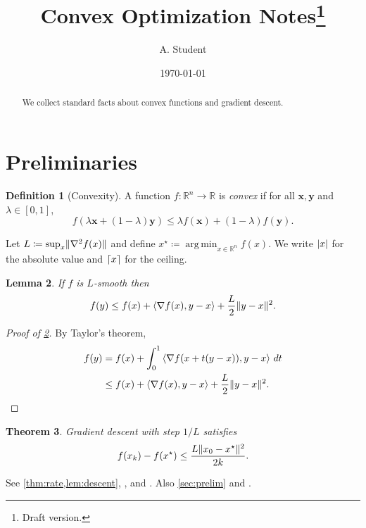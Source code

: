 \documentclass[11pt,a4paper]{article}
\title{Convex Optimization Notes\thanks{Draft version.}}
\author{A. Student}
\date{\today}
\DeclarePairedDelimiter{\abs}{\lvert}{\rvert}
\DeclarePairedDelimiter\norm{\lVert}{\rVert}
\DeclarePairedDelimiter{\ceil}{\lceil}{\rceil}
\DeclareMathOperator*{\argmin}{arg\,min}
\newcommand{\R}{\mathbb{R}}
\newcommand{\inner}[2]{\left\langle #1, #2 \right\rangle}
\theoremstyle{plain}
\newtheorem{theorem}{Theorem}[section]
\newtheorem{lemma}[theorem]{Lemma}
\theoremstyle{definition}
\newtheorem{definition}[theorem]{Definition}
\theoremstyle{remark}
\begin{document}
\maketitle

\begin{abstract}
We collect standard facts about convex functions and gradient descent.
\end{abstract}

\section{Preliminaries}\label{sec:prelim}

\begin{definition}[Convexity]\label{def:convex}
A function $f\colon \R^n \to \R$ is \emph{convex} if for all $\bm{x}, \bm{y}$ and $\lambda \in [0,1]$,
\[
  f(\lambda \bm{x} + (1-\lambda)\bm{y}) \le \lambda f(\bm{x}) + (1-\lambda) f(\bm{y}).
\]
\end{definition}

Let $L \coloneqq \sup_{x} \norm{\nabla^2 f(x)}$ and define $x^\star \coloneqq \argmin_{x \in \R^n} f(x)$.
We write $\abs*{x}$ for the absolute value and $\ceil{x}$ for the ceiling.

\begin{lemma}\label{lem:descent}
If $f$ is $L$-smooth then
\begin{equation}\label{eq:descent}
  f(y) \le f(x) + \inner{\nabla f(x)}{y - x} + \frac{L}{2}\norm{y - x}^2 .
\end{equation}
\end{lemma}

\begin{proof}[Proof of \cref{lem:descent}]
By Taylor's theorem,
\begin{align*}
  f(y) &= f(x) + \int_0^1 \inner{\nabla f(x + t(y-x))}{y-x}\,dt \\
       &\le f(x) + \inner{\nabla f(x)}{y-x} + \frac{L}{2}\norm{y-x}^2. \qedhere
\end{align*}
\end{proof}

\begin{theorem}\label{thm:rate}
Gradient descent with step $1/L$ satisfies
\begin{equation*}
  f(x_k) - f(x^\star) \le \frac{L \norm{x_0 - x^\star}^2}{2k}.
\end{equation*}
\end{theorem}

See \cref{thm:rate,lem:descent}, , and .
Also \autoref{sec:prelim} and .
\end{document}
